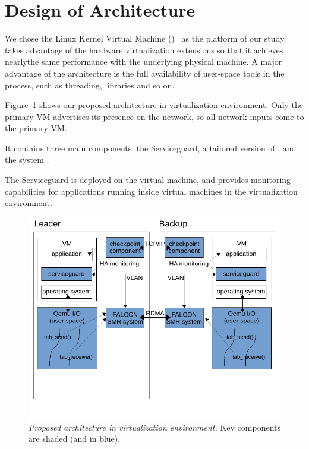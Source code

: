 \section{Design of Architecture} \label{sec:overview}

We chose the Linux Kernel Virtual Machine (\kvm)~\cite{kivity2007kvm} as the 
platform of our study. \kvm takes advantage of the hardware virtualization 
extensions so that it achieves nearlythe same performance with the underlying 
physical machine. A major advantage of the \kvm architecture is the full 
availability of user-space tools in the \qemu process, such as threading, 
libraries and so on.

Figure~\ref{fig:arc} shows our proposed architecture in \kvm virtualization environment. 
Only the primary VM advertises its presence on the network, so all network 
inputs come to the primary VM. 

It contains three main components: the Serviceguard, a tailored version 
of \qemu, and the \smr system \smrsystem. 

The Serviceguard is deployed on the virtual machine, and provides monitoring 
capabilities for applications running inside virtual machines in the \kvm 
virtualization environment.

\begin{figure}[t]
\centering
\includegraphics[width=.47\textwidth]{figures/arch}
\vspace{-.2in}
\caption{{\em Proposed architecture in \kvm virtualization environment.} Key 
components are shaded (and in blue).} \label{fig:arc}
\vspace{.05in}
\end{figure}
